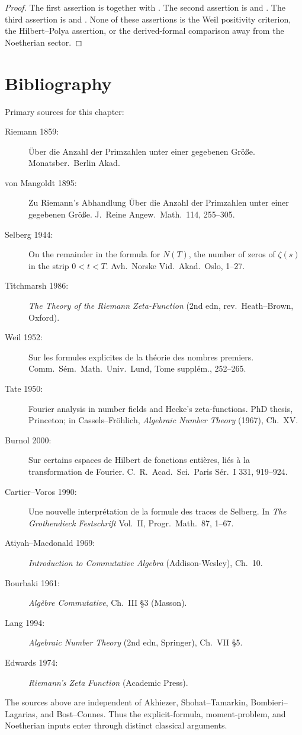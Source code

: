 \begin{proof}
The first assertion is  together with
. The second assertion is
 and
. The third assertion is
 and
. None of these assertions is the
Weil positivity criterion, the Hilbert--Polya assertion, or the
derived-formal comparison away from the Noetherian sector.
\end{proof}

\section{Bibliography}
\label{v4-arith:w5-i:bibliography}

Primary sources for this chapter:

\begin{description}
\item[Riemann 1859:] \"Uber die Anzahl der Primzahlen unter einer
gegebenen Gr\"o{\ss}e. Monatsber.~Berlin Akad.
\item[von Mangoldt 1895:] Zu Riemann's Abhandlung \"Uber die Anzahl
der Primzahlen unter einer gegebenen Gr\"o{\ss}e.
J.~Reine Angew.~Math.~114, 255--305.
\item[Selberg 1944:] On the remainder in the formula for \(N(T)\),
the number of zeros of \(\zeta(s)\) in the strip \(0<t<T\).
Avh.~Norske Vid.~Akad.~Oslo, 1--27.
\item[Titchmarsh 1986:] \emph{The Theory of the Riemann Zeta-Function}
(2nd edn, rev.~Heath--Brown, Oxford).
\item[Weil 1952:] Sur les formules explicites de la th\'eorie des
nombres premiers. Comm.~S\'em.~Math.~Univ.~Lund, Tome suppl\'em.,
252--265.
\item[Tate 1950:] Fourier analysis in number fields and Hecke's
zeta-functions. PhD thesis, Princeton; in Cassels--Fr\"ohlich,
\emph{Algebraic Number Theory} (1967), Ch.~XV.
\item[Burnol 2000:] Sur certains espaces de Hilbert de fonctions
enti\`eres, li\'es \`a la transformation de Fourier.
C.~R.~Acad.~Sci.~Paris S\'er.~I 331, 919--924.
\item[Cartier--Voros 1990:] Une nouvelle interpr\'etation de la formule
des traces de Selberg. In \emph{The Grothendieck Festschrift} Vol.~II,
Progr.~Math.~87, 1--67.
\item[Atiyah--Macdonald 1969:] \emph{Introduction to Commutative
Algebra} (Addison-Wesley), Ch.~10.
\item[Bourbaki 1961:] \emph{Alg\`ebre Commutative}, Ch.~III \S3
(Masson).
\item[Lang 1994:] \emph{Algebraic Number Theory} (2nd edn, Springer),
Ch.~VII \S5.
\item[Edwards 1974:] \emph{Riemann's Zeta Function} (Academic Press).
\end{description}

The sources above are independent of Akhiezer, Shohat--Tamarkin,
Bombieri--Lagarias, and Bost--Connes. Thus the explicit-formula,
moment-problem, and Noetherian inputs enter through distinct classical
arguments.
